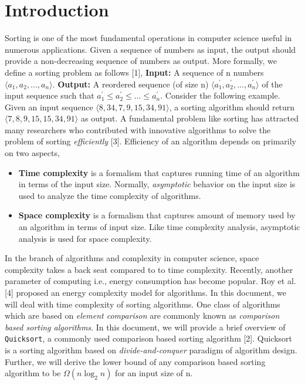 \documentclass[a4paper, 10pt,twocolumn]{article} %
\begin{document}
\section{Introduction} 
Sorting is one of the most fundamental operations in computer science useful in numerous applications. Given a sequence of numbers as input, the output should provide a non-decreasing sequence of numbers as output. More formally, we define a sorting problem as follows [1],\newline
\textbf{Input:} A sequence of n numbers $\big \langle a_{1},a_{2}, ..., a_{n}\big \rangle.$
\textbf{Output:} A reordered sequence (of size n) $\big \langle a_{1}^{'},a_{2}^{'}, ..., a_{n}^{'}\big \rangle$ of the input sequence such that $a_1^{'} \leq a_2^{'} \leq ... \leq a_n^{'}.$\newline
Consider the following example. Given an input sequence $\big \langle 8, 34, 7, 9, 15, 34, 91 \big \rangle$, a sorting algorithm should return $\big \langle 7,8,9,15,15,34,91 \big \rangle$ as output.\newline
\indent A fundamental problem like sorting has attracted many researchers who contributed with innovative algorithms to solve the problem of sorting \textit{efficiently} [3]. Efficiency of an algorithm depends on primarily on two aspects,
\begin{itemize}
    \item \textbf{Time complexity} is a formalism that captures running time of an algorithm in terms of the input size. Normally, \textit{asymptotic} behavior on the input size is used to analyze the time complexity of algorithms.
    \item \textbf{Space complexity} is a formalism that captures amount of memory used by an algorithm in terms of input size. Like time complexity analysis, asymptotic analysis is used for space complexity.
\end{itemize}
In the branch of algorithms and complexity in computer science, space complexity takes a back seat compared to to time complexity. Recently, another parameter of computing i.e., energy consumption has become popular. Roy et al. [4] proposed an energy complexity model for algorithms. In this document, we will deal with time complexity of sorting algorithms.\newline
\indent One class of algorithms which are based on \textit{element comparison} are commonly known as \textit{comparison based sorting algorithms}. In this document, we will provide a brief overview of \texttt{Quicksort}, a commonly used comparison based sorting algorithm [2]. Quicksort is a sorting algorithm  based on \textit{divide-and-conquer} paradigm of algorithm design. Further, we will derive the lower bound of any comparison based sorting algorithm to be $\Omega(n \log_{2} n)$ for an input size of n.
\end{document}
